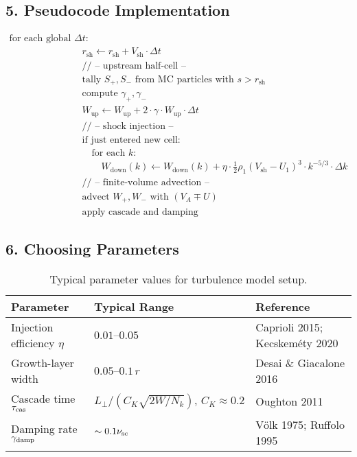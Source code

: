 \subsection*{5. Pseudocode Implementation}
\begin{align*}
\text{for each global } \Delta t: \quad & \\
\quad & r_{\text{sh}} \leftarrow r_{\text{sh}} + V_{\text{sh}} \cdot \Delta t \\[0.5em]
%
\quad & \text{// -- upstream half-cell --} \\
\quad & \text{tally } S_+, S_- \text{ from MC particles with } s > r_{\text{sh}} \\
\quad & \text{compute } \gamma_+, \gamma_- \\
\quad & W_{\text{up}} \leftarrow W_{\text{up}} + 2 \cdot \gamma \cdot W_{\text{up}} \cdot \Delta t \\[0.5em]
%
\quad & \text{// -- shock injection --} \\
\quad & \text{if just entered new cell:} \\
\quad & \quad \text{for each } k: \\
\quad & \quad \quad W_{\text{down}}(k) \leftarrow W_{\text{down}}(k) + 
    \eta \cdot \frac{1}{2} \rho_1 (V_{\text{sh}} - U_1)^3 \cdot k^{-5/3} \cdot \Delta k \\[0.5em]
%
\quad & \text{// -- finite-volume advection --} \\
\quad & \text{advect } W_+, W_- \text{ with } (V_A \mp U) \\
\quad & \text{apply cascade and damping}
\end{align*}

\subsection*{6. Choosing Parameters}
\begin{table}[h!]
\centering
\begin{tabular}{|l|l|l|}
\hline
\textbf{Parameter} & \textbf{Typical Range} & \textbf{Reference} \\
\hline
Injection efficiency $\eta$ & $0.01$–$0.05$ & Caprioli 2015; Kecskeméty 2020 \\
Growth-layer width & $0.05$–$0.1\,r$ & Desai \& Giacalone 2016 \\
Cascade time $\tau_{\rm cas}$ & $L_\perp / (C_K \sqrt{2W/N_k}),\, C_K \approx 0.2$ & Oughton 2011 \\
Damping rate $\gamma_{\rm damp}$ & $\sim 0.1\nu_{\rm sc}$ & Völk 1975; Ruffolo 1995 \\
\hline
\end{tabular}
\caption{Typical parameter values for turbulence model setup.}
\end{table}

